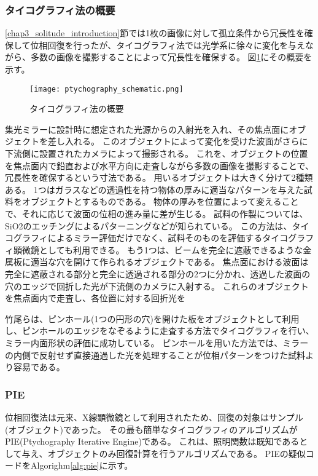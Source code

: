 \subsubsection{タイコグラフィ法の概要}
\ref{chap3_solitude_introduction}節では1枚の画像に対して孤立条件から冗長性を確保して位相回復を行ったが、タイコグラフィ法では光学系に徐々に変化を与えながら、多数の画像を撮影することによって冗長性を確保する。
図\ref{fig:ptychography_schematic}にその概要を示す。

\begin{figure}[!ht]
\centering
\texttt{[image: ptychography\_schematic.png]}
\caption{タイコグラフィ法の概要}
\label{fig:ptychography_schematic}
\end{figure}

集光ミラーに設計時に想定された光源からの入射光を入れ、その焦点面にオブジェクトを差し入れる。
このオブジェクトによって変化を受けた波面がさらに下流側に設置されたカメラによって撮影される。
これを、オブジェクトの位置を焦点面内で鉛直および水平方向に走査しながら多数の画像を撮影することで、冗長性を確保するという寸法である。
用いるオブジェクトは大きく分けて2種類ある。
1つはガラスなどの透過性を持つ物体の厚みに適当なパターンを与えた試料をオブジェクトとするものである。
物体の厚みを位置によって変えることで、それに応じて波面の位相の進み量に差が生じる。
試料の作製については、SiO2のエッチングによるパターニングなどが知られている。\cite{Godden2016}
この方法は、タイコグラフィによるミラー評価だけでなく、試料そのものを評価するタイコグラフィ顕微鏡としても利用できる。
もう1つは、ビームを完全に遮蔽できるような金属板に適当な穴を開けて作られるオブジェクトである。
焦点面における波面は完全に遮蔽される部分と完全に透過される部分の2つに分かれ、透過した波面の穴のエッジで回折した光が下流側のカメラに入射する。
これらのオブジェクトを焦点面内で走査し、各位置に対する回折光を

竹尾らは、ピンホール(1つの円形の穴)を開けた板をオブジェクトとして利用し、ピンホールのエッジをなぞるように走査する方法でタイコグラフィを行い、ミラー内面形状の評価に成功している。
ピンホールを用いた方法では、ミラーの内側で反射せず直接通過した光を処理することが位相パターンをつけた試料より容易である。

\subsubsection{PIE}
位相回復法は元来、X線顕微鏡として利用されたため、回復の対象はサンプル(オブジェクト)であった。
その最も簡単なタイコグラフィのアルゴリズムがPIE(Ptychography Iterative Engine)である。
これは、照明関数は既知であるとして与え、オブジェクトのみ回復計算を行うアルゴリズムである。
PIEの疑似コードをAlgorighm\ref{alg:pie}に示す。

